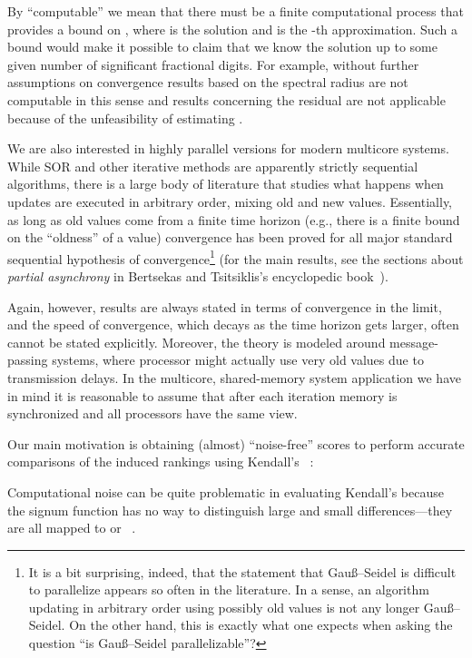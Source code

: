 \documentclass{article}
\newcommand{\Gauss}{Gau\ss}
\newcommand{\1}{\mathbf 1}
\begin{document}
By ``computable'' we mean that there must be a finite computational process that
provides a bound on ,
where  is the solution and  is the -th
approximation. Such a bound would make it possible to claim that we
know the solution up to some given number of significant fractional digits. For
example, without further assumptions on  convergence results based on the
spectral radius are not computable in this sense and results concerning the
residual are not applicable because of the unfeasibility of estimating
. 

We are also interested in highly parallel versions for modern multicore systems.
While SOR and other iterative methods are apparently strictly sequential
algorithms, there is a large body of literature that studies what happens when
updates are executed in arbitrary order, mixing old and new values. Essentially,
as long as old values come from a finite time horizon (e.g., there is a finite
bound on the ``oldness'' of a value) convergence has been proved for all major
standard sequential hypothesis of convergence\footnote{It is a bit surprising,
indeed, that the statement that \Gauss--Seidel is difficult to parallelize
appears so often in the literature. In a sense, an algorithm updating in
arbitrary order using possibly old values is not any longer \Gauss--Seidel. On
the other hand, this is exactly what one expects when asking the question ``is
\Gauss--Seidel parallelizable''?} (for the main results, see the sections
about \emph{partial asynchrony} in Bertsekas and Tsitsiklis's encyclopedic book~\cite{BeTPDCNM}).

Again, however, results are always stated in terms of convergence in the
limit, and the speed of convergence, which decays as the time horizon gets
larger, often cannot be stated explicitly. Moreover, the theory is modeled
around message-passing systems, where processor might actually use very old
values due to transmission delays. In the multicore, shared-memory system
application we have in mind it is reasonable to assume that after each iteration
memory is synchronized and all processors have the same view.

Our main motivation is obtaining (almost) ``noise-free'' scores to perform
accurate comparisons of the induced rankings using Kendall's ~\cite{KenTTRP}:
 
Computational noise can be quite problematic in evaluating Kendall's  because
the signum function has no way to distinguish large and small differences---they are all mapped to  or ~\cite{BPSTPTP}.
\end{document}
